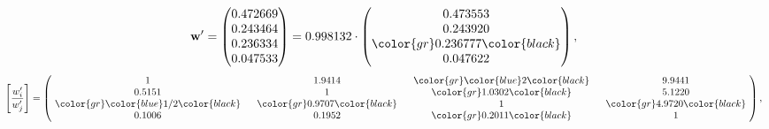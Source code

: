 \begin{example}
\begin{equation*}
\mathbf{w}^{\prime} =
\begin{pmatrix}
0.472669\\
0.243464\\
0.236334\\
0.047533
\end{pmatrix} =
0.998132\cdot
\begin{pmatrix}
0.473553\\
0.243920\\
\color{gr} 0.236777\color{black} \\
0.047622
\end{pmatrix},
\end{equation*}
\begin{equation*}
\left[ \frac{{w}^{\prime}_i}{{w}^{\prime}_j} \right] =
\begin{pmatrix}
$\,\,$ 1 $\,\,$ & $\,\,$1.9414$\,\,$ & $\,\,$\color{gr} \color{blue} 2\color{black} $\,\,$ & $\,\,$9.9441$\,\,$ \\
$\,\,$0.5151$\,\,$ & $\,\,$ 1 $\,\,$ & $\,\,$\color{gr} 1.0302\color{black} $\,\,$ & $\,\,$5.1220  $\,\,$ \\
$\,\,$\color{gr} \color{blue}  1/2\color{black} $\,\,$ & $\,\,$\color{gr} 0.9707\color{black} $\,\,$ & $\,\,$ 1 $\,\,$ & $\,\,$\color{gr} 4.9720\color{black}  $\,\,$ \\
$\,\,$0.1006$\,\,$ & $\,\,$0.1952$\,\,$ & $\,\,$\color{gr} 0.2011\color{black} $\,\,$ & $\,\,$ 1  $\,\,$ \\
\end{pmatrix},
\end{equation*}
\end{example}
\newpage
